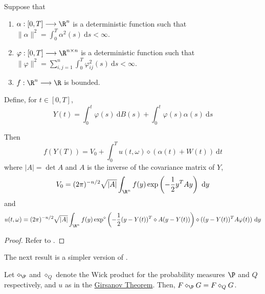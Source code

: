 \begin{theorem}\label{thm:aase4.4}
Suppose that
\begin{enumerate}
\item $\alpha : [0,T] \longrightarrow \R^n$ is a deterministic function such that $\| \alpha \|^2 = \int_0^T \alpha^2(s) ~\mathrm{d}s < \infty$.
\item $\varphi : [0,T] \longrightarrow \R^{n \times n}$ is a deterministic function such that $\| \varphi \|^2 = \sum_{i,j=1}^n \int_0^T \varphi_{ij}^2(s) ~\mathrm{d}s < \infty$.
\item $f : \R^n \longrightarrow \R$ is bounded.
\end{enumerate} 

Define, for $t \in [0,T]$,
\begin{equation*}
Y(t) = \int_0^t \varphi(s) ~\mathrm{d}B(s) + \int_0^t \varphi(s) \alpha(s) ~\mathrm{d}s
\end{equation*}

Then 
\begin{equation*}
f(Y(T)) = V_0 + \int_0^T u(t, \omega) \diamond (\alpha(t) + W(t)) ~\mathrm{d}t
\end{equation*}
where $|A| = \det A$ and $A$ is the inverse of the covariance matrix of $Y$,
\begin{equation*}
V_0 = (2 \pi)^{-n/2} \sqrt{|A|} \int_{\R^n} f(y) \exp \left( -\frac{1}{2} y^T Ay \right) ~\mathrm{d}y
\end{equation*}
and 
\begin{equation*}
u(t, \omega) = (2 \pi)^{-n/2} \sqrt{|A|} \int_{\R^n} f(y) \exp^\diamond \left( -\frac{1}{2} (y-Y(t))^T \diamond A(y-Y(t)) \right) \diamond ((y-Y(t))^T A \varphi(t)) ~\mathrm{d}y
\end{equation*}
\end{theorem}

\begin{proof}
Refer to \cite[Theorem 4.4]{aase2001using}.
\end{proof}

The next result is a simpler version of \cite[Lemma 3.21]{hu2003fractional}.

\begin{theorem}\label{thm:wick-diff-meas}
Let $\diamond_\P$ and $\diamond_Q$ denote the Wick product for the probability measures $\P$ and $Q$ respectively, and $u$ as in the \hyperref[thm:girsanov]{Girsanov Theorem}. Then, $F \diamond_\P G = F \diamond_Q G$.
\end{theorem} 

